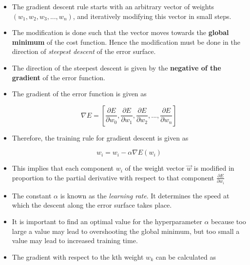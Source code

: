 \documentclass{article}
\theoremstyle{plain}
\theoremstyle{definition}
\begin{document}
\begin{itemize}
    \item The gradient descent rule starts with an arbitrary vector of weights $(w_1, w_2, w_3, ..., w_n)$, and iteratively modifying this vector in small steps.
    
    \item The modification is done such that the vector moves towards the \textbf{global minimum} of the cost function. Hence the modification must be done in the direction of \textit{steepest descent} of the error surface.
    
    \item The direction of the steepest descent is given by the \textbf{negative of the gradient} of the error function. 
    
    \item The gradient of the error function is given as
    
    \begin{equation*}
        \nabla E = \left [ \frac{\partial E}{ \partial w_0}, \frac{\partial E}{ \partial w_1}, \frac{\partial E}{ \partial w_2}, ..., \frac{\partial E}{ \partial w_n}\right]
    \end{equation*}
    
    \item Therefore, the training rule for gradient descent is given as
    
    \begin{equation}
        w_i = w_i - \alpha \nabla E(w_i)
    \end{equation}
    
    \item This implies that each component $w_i$ of the weight vector $\overrightarrow{w}$ is modified in proportion to the partial derivative with respect to that component $\frac{\partial E}{\partial w_i}$
    
    \item The constant $\alpha$ is known as the \textit{learning rate}. It determines the speed at which the descent along the error surface takes place.
    
    \item It is important to find an optimal value for the hyperparameter $\alpha$ because too large a value may lead to overshooting the global minimum, but too small a value may lead to increased training time. 
    
    \item The gradient with respect to the kth weight $w_k$ can be calculated as 
    

\end{itemize}
\end{document}
